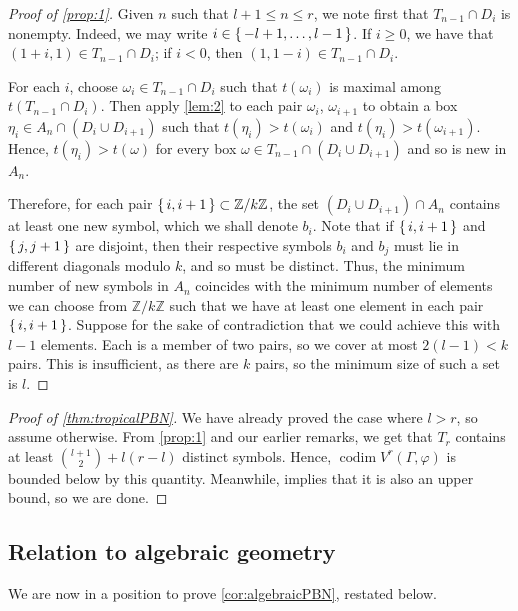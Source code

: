 \documentclass[11pt,reqno]{amsart}
\newcommand*{\Z}{\mathbb{Z}}
\DeclareMathOperator{\codim}{codim}
\theoremstyle{definition}
\theoremstyle{problem}
\theoremstyle{plain}
\theoremstyle{remark}
\theoremstyle{theorem}
\numberwithin{equation}{section}
\numberwithin{figure}{section}
\begin{document}
\begin{proof}[Proof of \cref{prop:1}]
  Given $n$ such that $l+1 \leq n \leq r$, we note first that
  $T_{n-1} \cap D_i$ is nonempty.  Indeed, we may write
  $i \in \set{-l+1,\ldots,l-1}$.  If $i \geq 0$, we have that
  $(1+i,1) \in T_{n-1} \cap D_i$; if $i < 0$, then
  $(1,1-i) \in T_{n-1} \cap D_i$.

  For each $i$, choose $\omega_i \in T_{n-1} \cap D_i$ such that
  $t(\omega_i)$ is maximal among $t(T_{n-1} \cap D_i)$.  Then apply
  \cref{lem:2} to each pair $\omega_i$, $\omega_{i+1}$ to obtain a box
  $\eta_i \in A_n \cap (D_i \cup D_{i+1})$ such that
  $t(\eta_i) > t(\omega_i)$ and $t(\eta_i) > t(\omega_{i+1})$.  Hence,
  $t(\eta_i) > t(\omega)$ for every box
  $\omega \in T_{n-1} \cap (D_i \cup D_{i+1})$ and so is new in $A_n$.

  Therefore, for each pair $\set{i,i+1} \subset \Z/k\Z$, the set
  $(D_i\cup D_{i+1})\cap A_n$ contains at least one new symbol, which
  we shall denote $b_i$.  Note that if $\set{i,i+1}$ and $\set{j,j+1}$
  are disjoint, then their respective symbols $b_i$ and $b_j$ must lie
  in different diagonals modulo $k$, and so must be distinct.  Thus,
  the minimum number of new symbols in $A_n$ coincides with the
  minimum number of elements we can choose from $\Z/k\Z$ such that we
  have at least one element in each pair $\set{i,i+1}$.  Suppose for
  the sake of contradiction that we could achieve this with $l-1$
  elements.  Each is a member of two pairs, so we cover at most
  $2(l-1)<k$ pairs.  This is insufficient, as there are $k$ pairs, so
  the minimum size of such a set is $l$.
\end{proof}

\begin{proof}[Proof of \cref{thm:tropicalPBN}]
  We have already proved the case where $l > r$, so assume otherwise.
  From \cref{prop:1} and our earlier remarks, we get that $T_r$
  contains at least $\binom{l+1}{2} + l(r-l)$ distinct symbols.
  Hence, $\codim V^r(\Gamma,\varphi)$ is bounded below by this
  quantity.  Meanwhile, \cite[Corollary~6.2.2, Remark~6.2.3]{len2019skeletons}
   implies that it is also
  an upper bound, so we are done.
\end{proof}

\subsection{Relation to algebraic
  geometry}\label{sec:algebraic-dim-proof}
We are now in a position to prove \cref{cor:algebraicPBN}, restated
below.  
\end{document}
